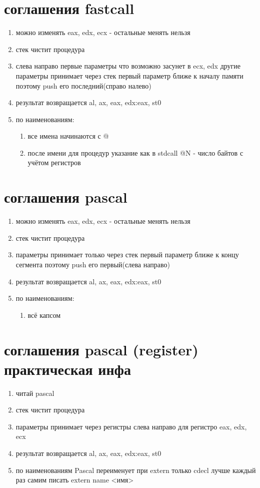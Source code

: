 \documentclass[a4paper,10pt]{article}
\begin{document}
\section*{соглашения fastcall}
\begin{enumerate}
    \item можно изменять eax, edx, ecx - остальные менять нельзя
    \item стек чистит процедура
    \item слева направо первые параметры что возможно засунет в ecx, edx другие параметры принимает через стек первый параметр ближе к началу памяти поэтому push его последний(справо налево)
    \item результат возвращается al, ax, eax, edx:eax, st0
    \item по наименованиям:
    \begin{enumerate}
        \item все имена начинаются с @
        \item после имени для процедур указание как в stdcall @N - число байтов с учётом регистров
    \end{enumerate}
\end{enumerate}
\section*{соглашения pascal}
\begin{enumerate}
    \item можно изменять eax, edx, ecx - остальные менять нельзя
    \item стек чистит процедура 
    \item параметры принимает только через стек первый параметр ближе к концу сегмента поэтому push его первый(слева направо)
    \item результат возвращается al, ax, eax, edx:eax, st0
    \item по наименованиям:
    \begin{enumerate}
        \item всё капсом
    \end{enumerate}
\end{enumerate}
\section*{соглашения pascal (register) практическая инфа}
\begin{enumerate}
    \item читай pascal
    \item стек чистит процедура 
    \item параметры принимает через регистры слева направо для регистро eax, edx, ecx 
    \item результат возвращается al, ax, eax, edx:eax, st0
    \item по наименованиям Pascal переименует при extern только cdecl лучше каждый раз самим писать extern name <имя>
\end{enumerate}
\end{document}
